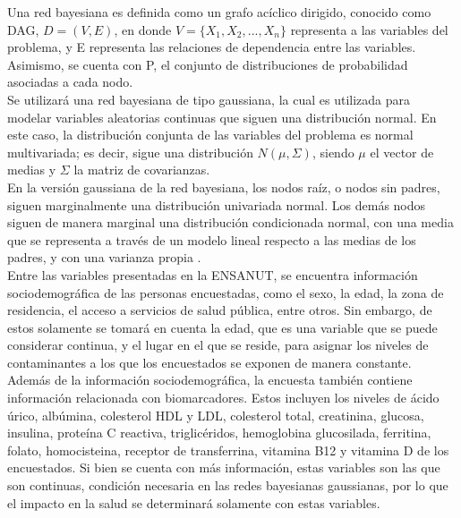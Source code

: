 \documentclass[12pt, letterpaper]{report}
\begin{document}
Una red bayesiana es definida como un grafo acíclico dirigido, conocido como DAG, $D=(V,E)$, en donde $V=\{X_1,X_2,...,X_n\}$ representa a las variables del problema, y E representa las relaciones de dependencia entre las variables. Asimismo, se cuenta con P, el conjunto de distribuciones de probabilidad asociadas a cada nodo.
\\

Se utilizará una red bayesiana de tipo gaussiana, la cual es utilizada para modelar variables aleatorias continuas que siguen una distribución normal. En este caso, la distribución conjunta de las variables del problema es normal multivariada; es decir, sigue una distribución $N(\mu, \Sigma)$, siendo $\mu$ el vector de medias y $\Sigma$ la matriz de covarianzas. \cite{tesis}
\\

En la versión gaussiana de la red bayesiana, los nodos raíz, o nodos sin padres, siguen marginalmente una distribución univariada normal. Los demás nodos siguen de manera marginal una distribución condicionada normal, con una media que se representa a través de un modelo lineal respecto a las medias de los padres, y con una varianza propia \cite{scutari2021bayesian}.
\\

Entre las variables presentadas en la ENSANUT, se encuentra información sociodemográfica de las personas encuestadas, como el sexo, la edad, la zona de residencia, el acceso a servicios de salud pública, entre otros. Sin embargo, de estos solamente se tomará en cuenta la edad, que es una variable que se puede considerar continua, y el lugar en el que se reside, para asignar los niveles de contaminantes a los que los encuestados se exponen de manera constante.
\\

Además de la información sociodemográfica, la encuesta también contiene información relacionada con biomarcadores. Estos incluyen los niveles de ácido úrico, albúmina, colesterol HDL y LDL, colesterol total, creatinina, glucosa, insulina, proteína C reactiva, triglicéridos, hemoglobina glucosilada, ferritina, folato, homocisteina, receptor de transferrina, vitamina B12 y vitamina D de los encuestados. Si bien se cuenta con más información, estas variables son las que son continuas, condición necesaria en las redes bayesianas gaussianas, por lo que el impacto en la salud se determinará solamente con estas variables.
\\
\end{document}
